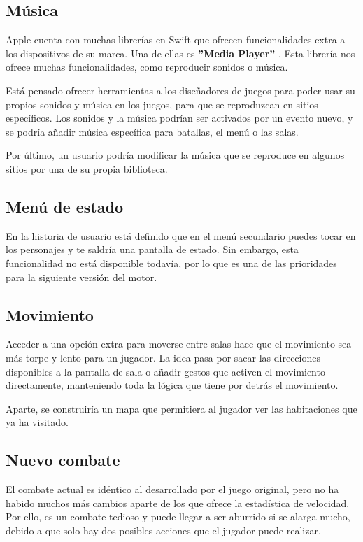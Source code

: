 \subsection{Música}
Apple cuenta con muchas librerías en Swift que ofrecen funcionalidades extra a los dispositivos de su marca. Una de ellas es \textbf{''Media Player''} \cite{mediaPlayer}.
Esta librería nos ofrece muchas funcionalidades, como reproducir sonidos o música.

Está pensado ofrecer herramientas a los diseñadores de juegos para poder usar su propios sonidos y música en los juegos, para que se reproduzcan en sitios específicos. Los sonidos y la música podrían ser activados por un evento nuevo, y se podría añadir música específica para batallas, el menú o las salas.

Por último, un usuario podría modificar la música que se reproduce en algunos sitios por una de su propia biblioteca.

\subsection{Menú de estado}
En la historia de usuario está definido que en el menú secundario puedes tocar en los personajes y te saldría una pantalla de estado. Sin embargo, esta funcionalidad no está disponible todavía, por lo que es una de las prioridades para la siguiente versión del motor.

\subsection{Movimiento}
Acceder a una opción extra para moverse entre salas hace que el movimiento sea más torpe y lento para un jugador. La idea pasa por sacar las direcciones disponibles a la pantalla de sala o añadir gestos que activen el movimiento directamente, manteniendo toda la lógica que tiene por detrás el movimiento.

Aparte, se construiría un mapa que permitiera al jugador ver las habitaciones que ya ha visitado.

\subsection{Nuevo combate}
El combate actual es idéntico al desarrollado por el juego original, pero no ha habido muchos más cambios aparte de los que ofrece la estadística de velocidad. Por ello, es un combate tedioso y puede llegar a ser aburrido si se alarga mucho, debido a que solo hay dos posibles acciones que el jugador puede realizar.

